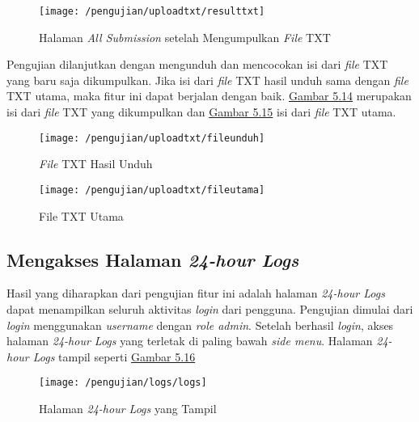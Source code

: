 	\begin{figure}[H]
		\centering  
		\texttt{[image: /pengujian/uploadtxt/resulttxt]}  
		\caption[Halaman \textit{All Submission} setelah Mengumpulkan \textit{File} TXT]{Halaman \textit{All Submission} setelah Mengumpulkan \textit{File} TXT} 
		\label{fig:resultttxt} 
	\end{figure}

	Pengujian dilanjutkan dengan mengunduh dan mencocokan isi dari \textit{file} TXT yang baru saja dikumpulkan. Jika isi dari \textit{file} TXT hasil unduh sama dengan \textit{file} TXT utama, maka fitur ini dapat berjalan dengan baik. \hyperref[fig:resultttxt]{Gambar 5.14} merupakan isi dari \textit{file} TXT yang dikumpulkan dan \hyperref[fig:resultttxt]{Gambar 5.15} isi dari \textit{file} TXT utama.
	
	\begin{figure}[H]
		\centering  
		\texttt{[image: /pengujian/uploadtxt/fileunduh]}  
		\caption[\textit{File} TXT Hasil Unduh]{\textit{File} TXT Hasil Unduh} 
		\label{fig:fileunduh} 
	\end{figure}
	
	\begin{figure}[H]
		\centering  
		\texttt{[image: /pengujian/uploadtxt/fileutama]}  
		\caption[File TXT Utama]{File TXT Utama} 
		\label{fig:fileutama} 
	\end{figure}

	\subsection{Mengakses Halaman \textit{24-hour Logs}}
	Hasil yang diharapkan dari pengujian fitur ini adalah halaman \textit{24-hour Logs} dapat menampilkan seluruh aktivitas \textit{login} dari pengguna. Pengujian dimulai dari \textit{login} menggunakan \textit{username} dengan \textit{role admin}. Setelah berhasil \textit{login}, akses halaman \textit{24-hour Logs} yang terletak di paling bawah \textit{side menu}. Halaman \textit{24-hour Logs} tampil seperti \hyperref[fig:logs]{Gambar 5.16}
	\begin{figure}[H]
		\centering  
		\texttt{[image: /pengujian/logs/logs]}  
		\caption[Halaman \textit{24-hour Logs} yang Tampil]{Halaman \textit{24-hour Logs} yang Tampil} 
		\label{fig:logs} 
	\end{figure}

